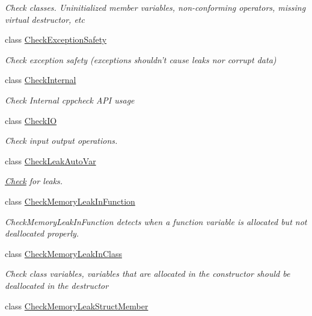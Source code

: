 \begin{DoxyCompactItemize}
\begin{DoxyCompactList}\small\item\em Check classes. Uninitialized member variables, non-\/conforming operators, missing virtual destructor, etc \end{DoxyCompactList}\item 
class \hyperlink{class_check_exception_safety}{Check\-Exception\-Safety}
\begin{DoxyCompactList}\small\item\em Check exception safety (exceptions shouldn't cause leaks nor corrupt data) \end{DoxyCompactList}\item 
class \hyperlink{class_check_internal}{Check\-Internal}
\begin{DoxyCompactList}\small\item\em Check Internal cppcheck A\-P\-I usage \end{DoxyCompactList}\item 
class \hyperlink{class_check_i_o}{Check\-I\-O}
\begin{DoxyCompactList}\small\item\em Check input output operations. \end{DoxyCompactList}\item 
class \hyperlink{class_check_leak_auto_var}{Check\-Leak\-Auto\-Var}
\begin{DoxyCompactList}\small\item\em \hyperlink{class_check}{Check} for leaks. \end{DoxyCompactList}\item 
class \hyperlink{class_check_memory_leak_in_function}{Check\-Memory\-Leak\-In\-Function}
\begin{DoxyCompactList}\small\item\em Check\-Memory\-Leak\-In\-Function detects when a function variable is allocated but not deallocated properly. \end{DoxyCompactList}\item 
class \hyperlink{class_check_memory_leak_in_class}{Check\-Memory\-Leak\-In\-Class}
\begin{DoxyCompactList}\small\item\em Check class variables, variables that are allocated in the constructor should be deallocated in the destructor \end{DoxyCompactList}\item 
class \hyperlink{class_check_memory_leak_struct_member}{Check\-Memory\-Leak\-Struct\-Member}

\end{DoxyCompactItemize}
